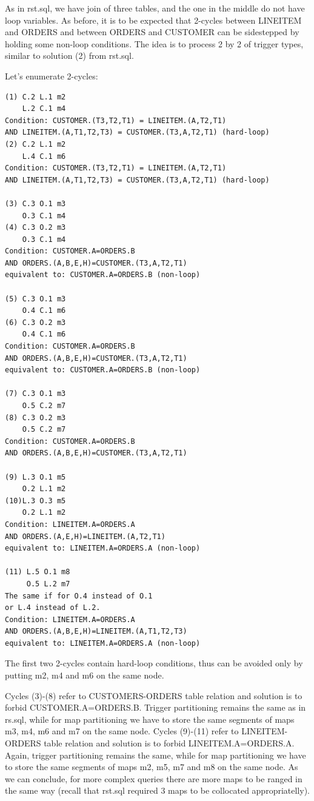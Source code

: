 \documentclass{sig-semester}
\begin{document}
As in rst.sql, we have join of three tables, and the one in the middle do not have loop variables. As before, it is to be expected that 2-cycles between LINEITEM and ORDERS and between ORDERS and CUSTOMER can be sidestepped by holding some non-loop conditions. The idea is to process 2 by 2 of trigger types, similar to solution (2) from rst.sql. 

\newpage
Let's enumerate 2-cycles:
\begin{verbatim}
(1) C.2 L.1 m2
    L.2 C.1 m4
Condition: CUSTOMER.(T3,T2,T1) = LINEITEM.(A,T2,T1) 
AND LINEITEM.(A,T1,T2,T3) = CUSTOMER.(T3,A,T2,T1) (hard-loop)
(2) C.2 L.1 m2   
    L.4 C.1 m6
Condition: CUSTOMER.(T3,T2,T1) = LINEITEM.(A,T2,T1)
AND LINEITEM.(A,T1,T2,T3) = CUSTOMER.(T3,A,T2,T1) (hard-loop)

(3) C.3 O.1 m3
    O.3 C.1 m4
(4) C.3 O.2 m3
    O.3 C.1 m4
Condition: CUSTOMER.A=ORDERS.B
AND ORDERS.(A,B,E,H)=CUSTOMER.(T3,A,T2,T1)
equivalent to: CUSTOMER.A=ORDERS.B (non-loop)

(5) C.3 O.1 m3
    O.4 C.1 m6        
(6) C.3 O.2 m3
    O.4 C.1 m6
Condition: CUSTOMER.A=ORDERS.B
AND ORDERS.(A,B,E,H)=CUSTOMER.(T3,A,T2,T1)
equivalent to: CUSTOMER.A=ORDERS.B (non-loop)

(7) C.3 O.1 m3
    O.5 C.2 m7     
(8) C.3 O.2 m3
    O.5 C.2 m7
Condition: CUSTOMER.A=ORDERS.B
AND ORDERS.(A,B,E,H)=CUSTOMER.(T3,A,T2,T1)

(9) L.3 O.1 m5
    O.2 L.1 m2
(10)L.3 O.3 m5
    O.2 L.1 m2
Condition: LINEITEM.A=ORDERS.A
AND ORDERS.(A,E,H)=LINEITEM.(A,T2,T1)
equivalent to: LINEITEM.A=ORDERS.A (non-loop)

(11) L.5 O.1 m8
     O.5 L.2 m7
The same if for O.4 instead of O.1
or L.4 instead of L.2.
Condition: LINEITEM.A=ORDERS.A
AND ORDERS.(A,B,E,H)=LINEITEM.(A,T1,T2,T3)
equivalent to: LINEITEM.A=ORDERS.A (non-loop)
\end{verbatim}

The first two 2-cycles contain hard-loop conditions, thus can be avoided only by putting m2, m4 and m6 on the same node.

Cycles (3)-(8) refer to CUSTOMERS-ORDERS table relation and solution is to forbid CUSTOMER.A=ORDERS.B. Trigger partitioning remains the same as in rs.sql, while for map partitioning we have to store the same segments of  maps m3, m4, m6 and m7 on the same node. Cycles (9)-(11) refer to LINEITEM-ORDERS table relation and solution is to forbid LINEITEM.A=ORDERS.A. Again, trigger partitioning remains the same, while for map partitioning we have to store the same segments of maps m2, m5, m7 and m8 on the same node. As we can conclude, for more complex queries there are more maps to be ranged in the same way (recall that rst.sql required 3 maps to be collocated appropriatelly).
\end{document}
